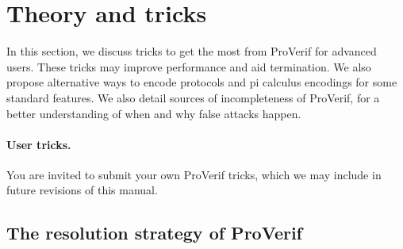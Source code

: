 \documentclass{book}
\begin{document}
\fussy

\section{Theory and tricks}

In this section, we discuss tricks to get the most from ProVerif for advanced users. These tricks may improve performance and aid termination. We also propose alternative ways to encode protocols and pi calculus encodings for some standard features. We also detail sources of incompleteness of ProVerif, for a better understanding of when and why false attacks happen.

\paragraph{User tricks.} You are invited to submit your own ProVerif tricks, which we may include in future revisions of this manual.

\subsection{The resolution strategy of ProVerif}\label{sec:algores}
\end{document}
